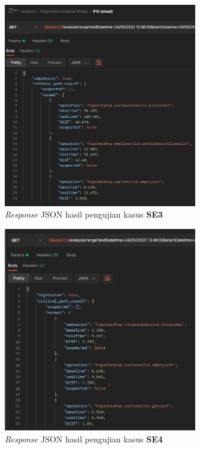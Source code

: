 \begin{figure}[!htb]
	\centering
	\includegraphics[width=0.75\textwidth]{resources/ch4/json/10.png}
	\caption{\textit{Response} JSON hasil pengujian kasus \textbf{SE3}}
	\label{result_json_10}
\end{figure}

\begin{figure}[!htb]
	\centering
	\includegraphics[width=0.75\textwidth]{resources/ch4/json/11.png}
	\caption{\textit{Response} JSON hasil pengujian kasus \textbf{SE4}}
	\label{result_json_9}
\end{figure}

